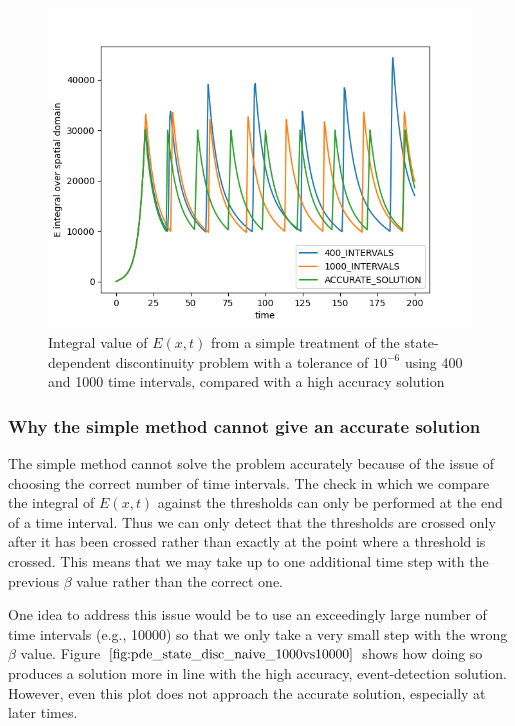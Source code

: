 \documentclass{article}
\begin{document}
\begin{figure}[H]
\centering
\includegraphics[width=0.7\linewidth]{./figures/pde_state_disc_naive_400vs1000}
\caption{Integral value of $E(x, t)$ from a simple treatment of the state-dependent discontinuity problem with a tolerance of $10^{-6}$ using 400 and 1000 time intervals, compared with a high accuracy solution}
\label{fig:pde_state_disc_naive_400vs1000}
\end{figure}

\subsubsection{Why the simple method cannot give an accurate solution}
\label{subsubsection:pde_state_naive_always_inaccurate}
The simple method cannot solve the problem accurately because of the issue of choosing the correct number of time intervals. The check in which we compare the integral of $E(x, t)$ against the thresholds can only be performed at the end of a time interval. Thus we can only detect that the thresholds are crossed only after it has been crossed rather than exactly at the point where a threshold is crossed. This means that we may take up to one additional time step with the previous $\beta$ value rather than the correct one.

One idea to address this issue would be to use an exceedingly large number of time intervals (e.g., 10000) so that we only take a very small step with the wrong $\beta$ value. Figure $\ref{fig:pde_state_disc_naive_1000vs10000}$ shows how doing so produces a solution more in line with the high accuracy, event-detection solution. However, even this plot does not approach the accurate solution, especially at later times. 
\end{document}
